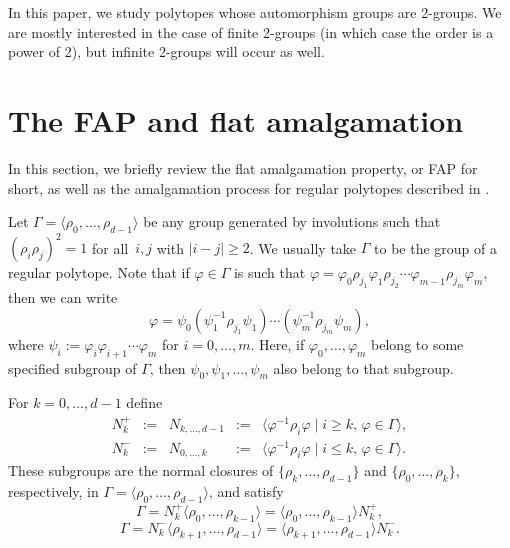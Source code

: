 \documentclass[12pt]{amsart}
\theoremstyle{definition}
\begin{document}
In this paper, we study polytopes whose automorphism groups are 2-groups. We are mostly interested in the case of finite 2-groups (in which case the order is a power of 2), but infinite 2-groups will occur as well. 

\section{The FAP and flat amalgamation}
\label{FAP}

In this section, we briefly review the flat amalgamation property, or FAP for short, as well as the amalgamation process for regular polytopes described in \cite[Sects.\,4E,\,4F]{McMSch2002}.

Let $\Gamma = \langle\rho_{0},\ldots,\rho_{d-1}\rangle$ be any group generated by involutions such that $(\rho_{i}\rho_{j})^{2} = 1$ for all~$i,j$ with $|i-j| \geq 2$. We usually take $\Gamma$ to be the group of a regular polytope.  Note that if $\varphi\in \Gamma$ is such that 
$\varphi = \varphi_{0}\rho_{j_{1}}\varphi_{1}\rho_{j_{2}} \cdots 
\varphi_{m-1}\rho_{j_{m}}\varphi_{m}$, 
then we can write 
\[\varphi  = \psi_{0}(\psi_{1}^{-1}\rho_{j_{1}}\psi_{1}) \cdots
(\psi_{m}^{-1}\rho_{j_{m}}\psi_{m}),  \]
where  $\psi_{i} := \varphi_{i}\varphi_{i+1} \cdots \varphi_{m}$ for $i = 0,\ldots,m$. 
Here, if $\varphi_{0},\ldots,\varphi_{m}$ belong to some specified subgroup
of $\Gamma$, then $\psi_{0},\psi_{1},\ldots,\psi_{m}$ also belong to that subgroup.

For $k = 0,\ldots,d-1$ define
\[\begin{array}{rclcl}
N_{k}^{+} & := & N_{k,\ldots,d-1} & := & \langle\varphi^{-1}\rho_{i}\varphi \mid i \geq k,\, \varphi \in
\Gamma\rangle,  \\[.03in]
N_{k}^{-} & := & N_{0,\ldots,k} & := & \langle\varphi^{-1}\rho_{i}\varphi \mid i  \leq k,\,\varphi \in
\Gamma\rangle.
\end{array}\]
These subgroups are the normal closures of $\{\rho_{k},\ldots,\rho_{d-1}\}$ and
$\{\rho_{0},\ldots,\rho_{k}\}$, respectively, in $\Gamma =
\langle\rho_{0},\ldots,\rho_{d-1}\rangle$, and satisfy 
\begin{equation}
\label{nkplus}
\Gamma = N_{k}^{+} \langle\rho_{0},\ldots,\rho_{k-1}\rangle =
\langle\rho_{0},\ldots,\rho_{k-1}\rangle N_{k}^{+},
\end{equation}
\begin{equation}
\label{nkminus}
\Gamma = N_{k}^{-} \langle\rho_{k+1},\ldots,\rho_{d-1}\rangle =
\langle\rho_{k+1},\ldots,\rho_{d-1}\rangle N_{k}^{-}.
\end{equation}
\end{document}
